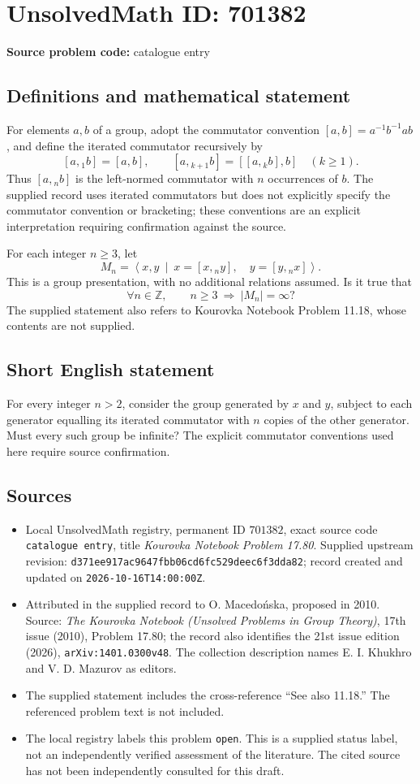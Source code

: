 \documentclass[11pt]{article}
\newcommand{\Z}{\mathbb{Z}}
\begin{document}
\section*{UnsolvedMath ID: 701382}
\textbf{Source problem code:} catalogue entry
\subsection{Definitions and mathematical statement}
For elements \(a,b\) of a group, adopt the commutator convention \([a,b]=a^{-1}b^{-1}ab\), and define the iterated commutator recursively by
\[
[a,{}_1b]=[a,b],\qquad [a,{}_{k+1}b]=[[a,{}_kb],b]\quad(k\geq 1).
\]
Thus \([a,{}_nb]\) is the left-normed commutator with \(n\) occurrences of \(b\). The supplied record uses iterated commutators but does not explicitly specify the commutator convention or bracketing; these conventions are an explicit interpretation requiring confirmation against the source.

For each integer \(n\geq 3\), let
\[
M_n=\left\langle x,y\ \middle|\ x=[x,{}_ny],\quad y=[y,{}_nx]\right\rangle.
\]
This is a group presentation, with no additional relations assumed. Is it true that
\[
\forall n\in\Z,\qquad n\geq 3\ \Longrightarrow\ |M_n|=\infty?
\]
The supplied statement also refers to Kourovka Notebook Problem 11.18, whose contents are not supplied.
\subsection{Short English statement}
For every integer \(n>2\), consider the group generated by \(x\) and \(y\), subject to each generator equalling its iterated commutator with \(n\) copies of the other generator. Must every such group be infinite? The explicit commutator conventions used here require source confirmation.
\subsection{Sources}
\begin{itemize}
\item Local UnsolvedMath registry, permanent ID \(701382\), exact source code \texttt{catalogue entry}, title \emph{Kourovka Notebook Problem 17.80}. Supplied upstream revision: \texttt{d371ee917ac9647fbb06cd6fc529deec6f3dda82}; record created and updated on \texttt{2026-10-16T14:00:00Z}.
\item Attributed in the supplied record to O. Macedo\'nska, proposed in 2010. Source: \emph{The Kourovka Notebook (Unsolved Problems in Group Theory)}, 17th issue (2010), Problem 17.80; the record also identifies the 21st issue edition (2026), \texttt{arXiv:1401.0300v48}. The collection description names E. I. Khukhro and V. D. Mazurov as editors.
\item The supplied statement includes the cross-reference ``See also 11.18.'' The referenced problem text is not included.
\item The local registry labels this problem \texttt{open}. This is a supplied status label, not an independently verified assessment of the literature. The cited source has not been independently consulted for this draft.
\end{itemize}
\end{document}
